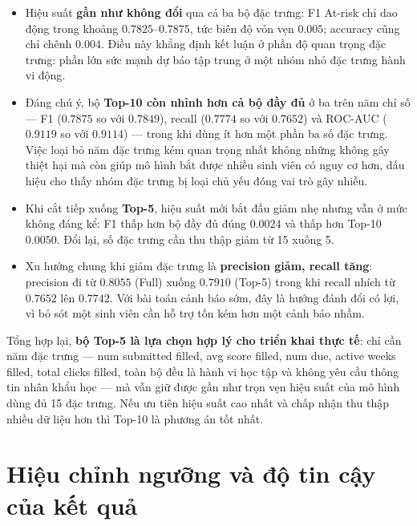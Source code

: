 \documentclass[a4paper]{article}
\newcommand{\code}[1]{{\ttfamily\def\_{\textunderscore\discretionary{}{}{}}#1}}
\def\code#1{#1}%
\def\_{ }%
\begin{document}


\begin{itemize}[leftmargin=*]
  \item Hiệu suất \textbf{gần như không đổi} qua cả ba bộ đặc trưng: F1
        At-risk chỉ dao động trong khoảng $0.7825$--$0.7875$, tức biên độ
        vỏn vẹn $0.005$; accuracy cũng chỉ chênh $0.004$. Điều này khẳng định
        kết luận ở phần độ quan trọng đặc trưng: phần lớn sức mạnh dự báo tập
        trung ở một nhóm nhỏ đặc trưng hành vi động.
  \item Đáng chú ý, bộ \textbf{Top-10 còn nhỉnh hơn cả bộ đầy đủ} ở ba trên
        năm chỉ số --- F1 ($0.7875$ so với $0.7849$), recall ($0.7774$ so với
        $0.7652$) và ROC-AUC ($0.9119$ so với $0.9114$) --- trong khi dùng ít
        hơn một phần ba số đặc trưng. Việc loại bỏ năm đặc trưng kém quan
        trọng nhất không những không gây thiệt hại mà còn giúp mô hình bắt
        được nhiều sinh viên có nguy cơ hơn, dấu hiệu cho thấy nhóm đặc trưng
        bị loại chủ yếu đóng vai trò gây nhiễu.
  \item Khi cắt tiếp xuống \textbf{Top-5}, hiệu suất mới bắt đầu giảm nhẹ
        nhưng vẫn ở mức không đáng kể: F1 thấp hơn bộ đầy đủ đúng $0.0024$ và
        thấp hơn Top-10 $0.0050$. Đổi lại, số đặc trưng cần thu thập giảm từ
        15 xuống 5.
  \item Xu hướng chung khi giảm đặc trưng là \textbf{precision giảm, recall
        tăng}: precision đi từ $0.8055$ (Full) xuống $0.7910$ (Top-5) trong
        khi recall nhích từ $0.7652$ lên $0.7742$. Với bài toán cảnh báo sớm,
        đây là hướng đánh đổi có lợi, vì bỏ sót một sinh viên cần hỗ trợ tốn
        kém hơn một cảnh báo nhầm.
\end{itemize}

Tổng hợp lại, \textbf{bộ Top-5 là lựa chọn hợp lý cho triển khai thực tế}: chỉ
cần năm đặc trưng --- \code{num\_submitted\_filled}, \code{avg\_score\_filled},
\code{num\_due}, \code{active\_weeks\_filled}, \code{total\_clicks\_filled},
toàn bộ đều là hành vi học tập và không yêu cầu thông tin nhân khẩu học --- mà
vẫn giữ được gần như trọn vẹn hiệu suất của mô hình dùng đủ 15 đặc trưng. Nếu
ưu tiên hiệu suất cao nhất và chấp nhận thu thập nhiều dữ liệu hơn thì Top-10
là phương án tốt nhất.

\section{Hiệu chỉnh ngưỡng và độ tin cậy của kết quả}
\label{sec:threshold_bootstrap}
\end{document}
